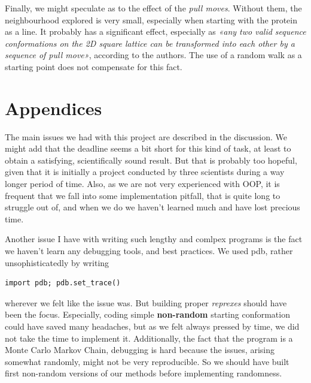 \documentclass[a4paper, 12pt]{article}
\begin{document}
Finally, we might speculate as to the effect of the \emph{pull moves}. Without them, the neighbourhood explored is very small, especially when starting with the protein as a line. It probably has a significant effect, especially as \emph{«any two valid sequence conformations on the 2D square lattice can be transformed into each other by a sequence of pull move»}, according to the authors. The use of a random walk as a starting point does not compensate for this fact.

\clearpage
\section*{Appendices}
\label{sec:orgf11fa11}
The main issues we had with this project are described in the discussion. We might add that the deadline seems a bit short for this kind of task, at least to obtain a satisfying, scientifically sound result. But that is probably too hopeful, given that it is initially a project conducted by three scientists during a way longer period of time. Also, as we are not very experienced with OOP, it is frequent that we fall into some implementation pitfall, that is quite long to struggle out of, and when we do we haven't learned much and have lost precious time.

Another issue I have with writing such lengthy and comlpex programs is the fact we haven't learn any debugging tools, and best practices. We used pdb, rather unsophisticatedly by writing
\begin{verbatim}
import pdb; pdb.set_trace()
\end{verbatim}

wherever we felt like the issue was. But building proper \emph{reprexes} should have been the focus. Especially, coding simple \textbf{non-random} starting conformation could have saved many headaches, but as we felt always pressed by time, we did not take the time to implement it. Additionally, the fact that the program is a Monte Carlo Markov Chain, debugging is hard because the issues, arising somewhat randomly, might not be very reproducible. So we should have built first non-random versions of our methods before implementing randomness.
\end{document}
